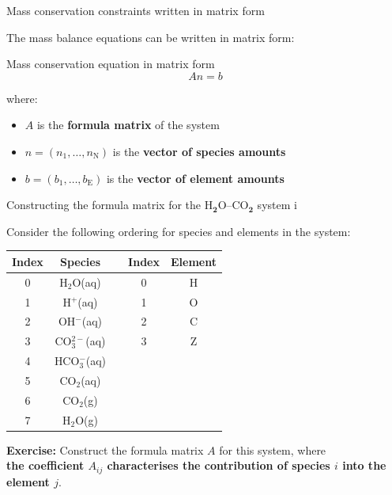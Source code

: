 %
\begin{frame}{Mass conservation constraints written in matrix form}

The mass balance equations can be written in matrix form: \\[10pt]

\begin{cbox}{Mass conservation equation in matrix form}{\Large{}
\[
An=b
\]
}\end{cbox}where:
\begin{itemize}
\item $A$ is the \textbf{formula matrix} of the system
\item $n=(n_{1},\ldots,n_{\text{N}})$ is the \textbf{vector of species
amounts}
\item $b=(b_{1},\ldots,b_{\text{E}})$ is the \textbf{vector of element
amounts}
\end{itemize}
\end{frame}
%
%
\begin{frame}[<+->]{Constructing the formula matrix for the H$_{\boldsymbol{2}}$O–CO$_{\boldsymbol{2}}$ system\; i}

Consider the following ordering for species and elements in the system:
\begin{center}
\begin{tabular*}{1\textwidth}{@{\extracolsep{\fill}}ccccc}
\toprule 
\textbf{Index} & \textbf{Species} &  & \textbf{Index} & \textbf{Element}\tabularnewline
\midrule
0 & H$_{2}$O(aq) &  & 0 & H\tabularnewline
1 & H$^{+}$(aq) &  & 1 & O\tabularnewline
2 & OH$^{-}$(aq) &  & 2 & C\tabularnewline
3 & CO$_{3}^{2-}$(aq) &  & 3 & Z\tabularnewline
4 & HCO$_{3}^{-}$(aq) &  &  & \tabularnewline
5 & CO$_{2}$(aq) &  &  & \tabularnewline
6 & CO$_{2}$(g) &  &  & \tabularnewline
7 & H$_{2}$O(g) &  &  & \tabularnewline
\bottomrule
\end{tabular*}
\par\end{center}

\alert{\textbf{Exercise:}} Construct the formula matrix $A$ for this system, where \\
\alert{\textbf{the coefficient $A_{ij}$ characterises the contribution of species 
$i$ into the element $j$}}. 
\end{frame}
%


